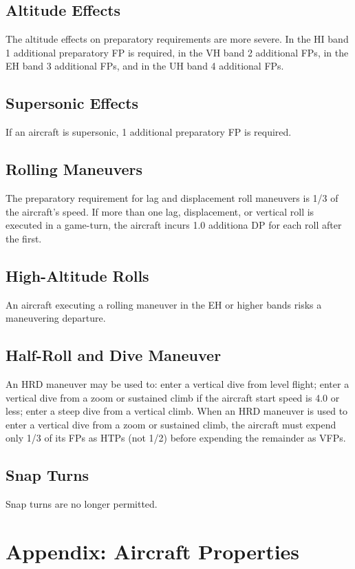 \documentclass[10pt]{article}
\begin{document}
\subsection{Altitude Effects} The altitude effects on preparatory requirements are more severe. In the HI band 1 additional preparatory FP is required, in the VH band 2 additional FPs, in the EH band 3 additional FPs, and in the UH band 4 additional FPs.

\subsection{Supersonic Effects} If an aircraft is supersonic, 1 additional preparatory FP is required.

\subsection{Rolling Maneuvers} The preparatory requirement for lag and displacement roll maneuvers is 1/3 of the aircraft's speed. If more than one lag, displacement, or vertical roll is executed in a game-turn, the aircraft incurs 1.0 additiona DP for each roll after the first.

\subsection{High-Altitude Rolls} An aircraft executing a rolling maneuver in the EH or higher bands risks a maneuvering departure.

\subsection{Half-Roll and Dive Maneuver} An HRD maneuver may be used to: enter a vertical dive from level flight; enter a vertical dive from a zoom or sustained climb if the aircraft start speed is 4.0 or less; enter a steep dive from a vertical climb. When an HRD maneuver is used to enter a vertical dive from a zoom or sustained climb, the aircraft must expend only 1/3 of its FPs as HTPs (not 1/2) before expending the remainder as VFPs.

\subsection{Snap Turns} Snap turns are no longer permitted.

\section{Appendix: Aircraft Properties}
\end{document}
